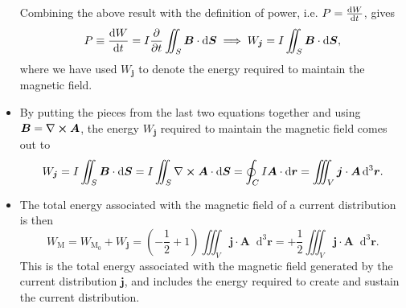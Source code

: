 \documentclass[11pt, a4paper]{article}
\newcommand{\diff}{\mathop{}\!\mathrm{d}} %
\newcommand{\dr}{\diff^{3} \r}  %
\renewcommand{\vec}[1]{\bm{#1}} %
\renewcommand{\r}{\vec{r}}
\newcommand{\B}{\vec{B}} %
\newcommand{\A}{\vec{A}} %
\renewcommand{\j}{\vec{j}}  %
\renewcommand{\curl}{\nabla \cross}
\begin{document}
\begin{itemize}
    Combining the above result with the definition of power, i.e. $ P = \dv{W}{t} $, gives 
    \begin{equation*}
        P \equiv \dv{W}{t} = I \pdv{t} \iint_{S} \B \cdot \diff \vec{S} \implies W_{\j} = I \iint_{S} \B \cdot \diff \vec{S},
    \end{equation*}
    where we have used $ W_{\j} $ to denote the energy required to maintain the magnetic field.
    

    \item By putting the pieces from the last two equations together and using $ \B = \curl \A $, the energy $ W_{\j} $ required to maintain the magnetic field comes out to
    \begin{equation*}
        W_{\j} = I \iint_{S} \B \cdot \diff \vec{S} = I \iint_{S} \curl \A \cdot \diff \vec{S} = \oint_{C} I \A \cdot \diff \r = \iiint_{V} \j \cdot \A \dr.
    \end{equation*}
    
    \item The total energy associated with the magnetic field of a current distribution is then
    \begin{equation*}
        W_{\text{M}} = W_{\text{M}_{0}} + W_{\vec{j}} = \left( -\frac{1}{2} + 1 \right) \iiint_{V} \j \cdot \A \dr = + \frac{1}{2} \iiint_{V} \j \cdot \A \dr.
    \end{equation*}
    This is the total energy associated with the magnetic field generated by the current distribution $ \j $, and includes the energy required to create and sustain the current distribution.
    
\end{itemize}
\end{document}
